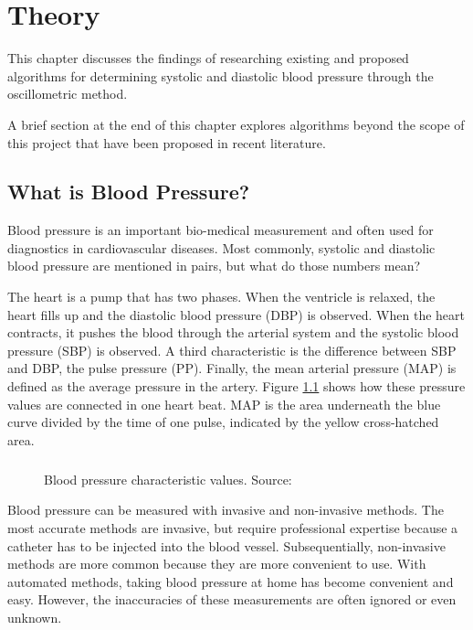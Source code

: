 \chapter[theory]{Theory} %
This chapter discusses the findings of researching existing and proposed algorithms for determining systolic and diastolic blood pressure through the oscillometric method.

A brief section at the end of this chapter explores algorithms beyond the scope of this project that have been proposed in recent literature.

\section{What is Blood Pressure?}
Blood pressure is an important bio-medical measurement and often used for  diagnostics in cardiovascular diseases. Most commonly, systolic and diastolic blood pressure are mentioned in pairs, but what do those numbers mean?

The heart is a pump that has two phases. When the ventricle is relaxed, the heart fills up and the diastolic blood pressure (DBP) is observed. When the heart contracts, it pushes the blood through the arterial system and the systolic blood pressure (SBP) is observed. A third characteristic is the difference between SBP and DBP, the pulse pressure (PP). Finally, the mean arterial pressure (MAP) is defined as the average pressure in the artery. Figure \ref{fig:BP} shows how these pressure values are connected in one heart beat. MAP is the area underneath the blue curve divided by the time of one pulse, indicated by the yellow cross-hatched area. \cite{Boron2012}\paragraph{}

\begin{figure}[]
\centering
\caption{Blood pressure characteristic values. Source: \cite{Boron2012}}
\label{fig:BP}
\end{figure}


Blood pressure can be measured with invasive and non-invasive methods. The most accurate methods are invasive, but require professional expertise because a catheter has to be injected into the blood vessel. Subsequentially, non-invasive methods are more common because they are more convenient to use. With automated methods, taking blood pressure at home has become convenient and easy. However, the inaccuracies of these measurements are often ignored or even unknown.

